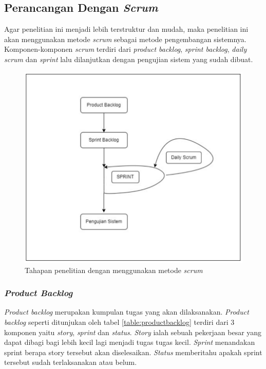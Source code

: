 \documentclass[
	a4paper, %
	10pt, %
	unnumberedsections, %
	twoside, %
]{LTJournalArticle}
\begin{document}
\subsection{Perancangan Dengan \textit{Scrum}}
Agar penelitian ini menjadi lebih terstruktur dan mudah, maka penelitian ini
akan menggunakan metode \textit{scrum} sebagai metode pengembangan sistemnya.
Komponen-komponen \textit{scrum} terdiri dari \textit{product backlog}, \textit{sprint backlog}, \textit{daily scrum} dan \textit{sprint} lalu dilanjutkan dengan pengujian sistem yang sudah dibuat.

\begin{figure}[H]
	\includegraphics[width=\linewidth]{desain-penelitian.png}
	\caption{Tahapan penelitian dengan menggunakan metode \textit{scrum}}
\end{figure}

\subsubsection{\textit{Product Backlog}}
\textit{Product backlog} merupakan kumpulan tugas yang akan dilaksanakan. \textit{Product backlog} seperti ditunjukan oleh tabel \ref{table:productbacklog} terdiri dari 3 komponen yaitu \textit{story}, \textit{sprint} dan \textit{status}. \textit{Story} ialah sebuah pekerjaan besar yang dapat dibagi bagi lebih kecil lagi menjadi tugas tugas kecil. \textit{Sprint} menandakan sprint berapa story tersebut akan diselesaikan. \textit{Status} memberitahu apakah sprint tersebut sudah terlaksanakan atau belum.
\end{document}
